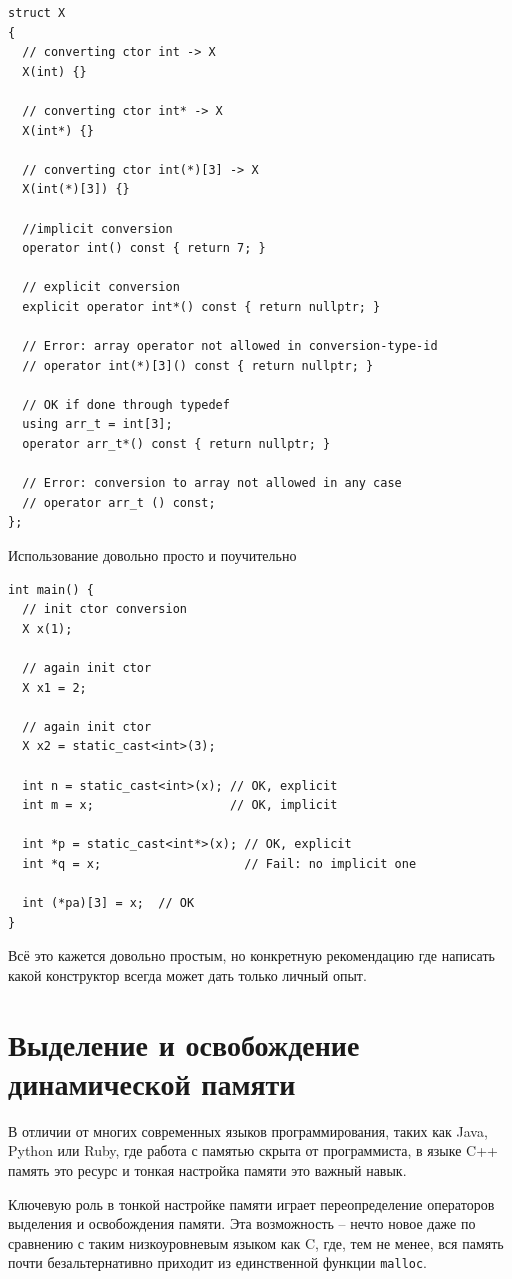 \documentclass[a4paper,12pt,oneside]{book}
\begin{document}
\begin{lstlisting}
struct X 
{
  // converting ctor int -> X
  X(int) {}

  // converting ctor int* -> X
  X(int*) {}

  // converting ctor int(*)[3] -> X
  X(int(*)[3]) {}

  //implicit conversion
  operator int() const { return 7; }
 
  // explicit conversion
  explicit operator int*() const { return nullptr; }
 
  // Error: array operator not allowed in conversion-type-id
  // operator int(*)[3]() const { return nullptr; }

  // OK if done through typedef
  using arr_t = int[3];
  operator arr_t*() const { return nullptr; } 

  // Error: conversion to array not allowed in any case
  // operator arr_t () const; 
};
\end{lstlisting}
 
Использование довольно просто и поучительно

\begin{lstlisting}
int main() {
  // init ctor conversion
  X x(1);

  // again init ctor
  X x1 = 2;

  // again init ctor
  X x2 = static_cast<int>(3);
 
  int n = static_cast<int>(x); // OK, explicit
  int m = x;                   // OK, implicit
 
  int *p = static_cast<int*>(x); // OK, explicit
  int *q = x;                    // Fail: no implicit one
 
  int (*pa)[3] = x;  // OK
}
\end{lstlisting}

Всё это кажется довольно простым, но конкретную рекомендацию где написать какой конструктор всегда может дать только личный опыт.

\pagebreak
\section{Выделение и освобождение динамической памяти}\label{subsec:newdeleteredef}

В отличии от многих современных языков программирования, таких как Java, Python или Ruby, где работа с памятью скрыта от программиста, в языке C++ память это ресурс и тонкая настройка памяти это важный навык.

Ключевую роль в тонкой настройке памяти играет переопределение операторов выделения и освобождения памяти. Эта возможность -- нечто новое даже по сравнению с таким низкоуровневым языком как C, где, тем не менее, вся память почти безальтернативно приходит из единственной функции \lstinline!malloc!.
\end{document}

